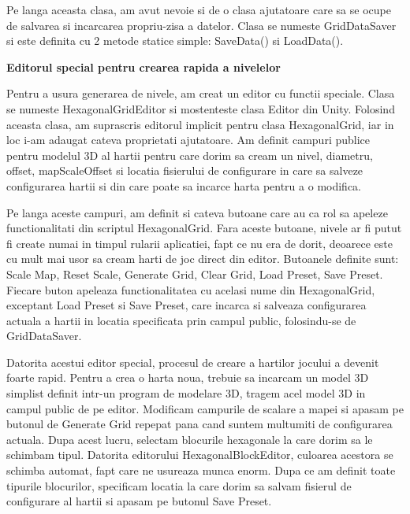 \documentclass[12pt, a4paper]{article}
\begin{document}
	Pe langa aceasta clasa, am avut nevoie si de o clasa ajutatoare care sa se ocupe de salvarea si incarcarea propriu-zisa a datelor. Clasa se numeste GridDataSaver si este definita cu 2 metode statice simple: SaveData() si LoadData().
	\newline
	
	
	
	
	
	\textbf{Editorul special pentru crearea rapida a nivelelor}
	
	Pentru a usura generarea de nivele, am creat un editor cu functii speciale. Clasa se numeste HexagonalGridEditor si mostenteste clasa Editor din Unity. Folosind aceasta clasa, am suprascris editorul implicit pentru clasa HexagonalGrid, iar in loc i-am adaugat cateva proprietati ajutatoare. Am definit campuri publice pentru modelul 3D al hartii pentru care dorim sa cream un nivel, diametru, offset, mapScaleOffset si locatia fisierului de configurare in care sa salveze configurarea hartii si din care poate sa incarce harta pentru a o modifica.
	\newline
	
	Pe langa aceste campuri, am definit si cateva butoane care au ca rol sa apeleze functionalitati din scriptul HexagonalGrid. Fara aceste butoane, nivele ar fi putut fi create numai in timpul rularii aplicatiei, fapt ce nu era de dorit, deoarece este cu mult mai usor sa cream harti de joc direct din editor. Butoanele definite sunt: Scale Map, Reset Scale, Generate Grid, Clear Grid, Load Preset, Save Preset. Fiecare buton apeleaza functionalitatea cu acelasi nume din HexagonalGrid, exceptant Load Preset si Save Preset, care incarca si salveaza configurarea actuala a hartii in locatia specificata prin campul public, folosindu-se de GridDataSaver.
	\newline
	
	Datorita acestui editor special, procesul de creare a hartilor jocului a devenit foarte rapid. Pentru a crea o harta noua, trebuie sa incarcam un model 3D simplist definit intr-un program de modelare 3D, tragem acel model 3D in campul public de pe editor. Modificam campurile de scalare a mapei si apasam pe butonul de Generate Grid repepat pana cand suntem multumiti de configurarea actuala. Dupa acest lucru, selectam blocurile hexagonale la care dorim sa le schimbam tipul. Datorita editorului HexagonalBlockEditor, culoarea acestora se schimba automat, fapt care ne usureaza munca enorm. Dupa ce am definit toate tipurile blocurilor, specificam locatia la care dorim sa salvam fisierul de configurare al hartii si apasam pe butonul Save Preset.
	\newline
	
\end{document}
